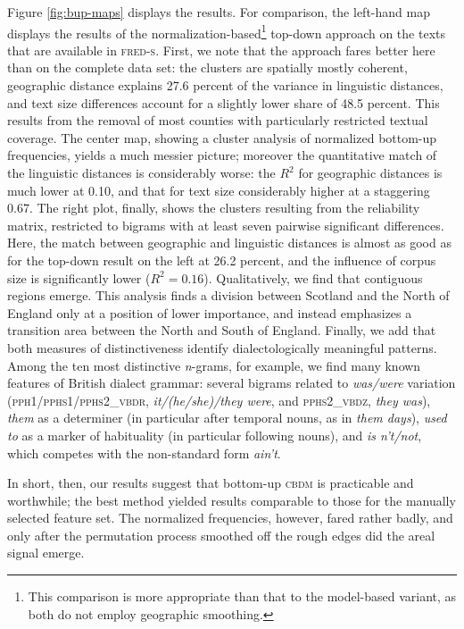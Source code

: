 \documentclass[output=paper]{LSP/langsci}
\begin{document}
Figure \ref{fig:bup-maps} displays the results.
For comparison, the left-hand map displays the results of the normalization-based\footnote{This comparison is more appropriate than that to the model-based variant, as both do not employ geographic smoothing.} top-down approach on the texts that are available in \textsc{fred-s}.
First, we note that the approach fares better here than on the complete data set: the clusters are spatially mostly coherent, geographic distance explains 27.6 percent of the variance in linguistic distances, and text size differences account for a slightly lower share of 48.5 percent. 
This results from the removal of most counties with particularly restricted textual coverage.
The center map, showing a cluster analysis of normalized bottom-up frequencies, yields a much messier picture; moreover the quantitative match of the linguistic distances is considerably worse: the $R^2$ for geographic distances is much lower at 0.10, and that for text size considerably higher at a staggering 0.67.
The right plot, finally, shows the clusters resulting from the reliability matrix, restricted to bigrams with at least seven pairwise significant differences.
Here, the match between geographic and linguistic distances is almost as good as for the top-down result on the left at 26.2 percent, and the influence of corpus size is significantly lower ($R^2 = 0.16$).
Qualitatively, we find that contiguous regions emerge. 
This analysis finds a division between Scotland and the North of England only at a position of lower importance, and instead emphasizes a transition area between the North and South of England.
Finally, we add that both measures of distinctiveness identify dialectologically meaningful patterns.
Among the ten most distinctive \emph{n}-grams, for example, we find many known features of British dialect grammar: several bigrams related to \emph{was/were} variation (\textsc{pph1/pphs1/pphs2\_vbdr}, \emph{it/(he/she)/they were}, and \textsc{pphs2\_vbdz}, \emph{they was}), \emph{them} as a determiner (in particular after temporal nouns, as in \emph{them days}), \emph{used to} as a marker of habituality (in particular following nouns), and \emph{is n't/not}, which competes with the non-standard form \emph{ain't}.

In short, then, our results suggest that bottom-up \textsc{cbdm} is practicable and worthwhile; the best method yielded results comparable to those for the manually selected feature set. 
The normalized frequencies, however, fared rather badly, and only after the permutation process smoothed off the rough edges did the areal signal emerge.
\end{document}
